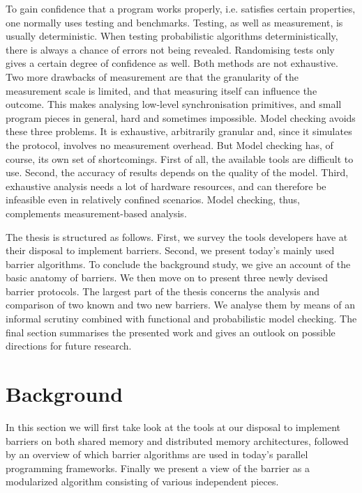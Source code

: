 \documentclass[a4paper, 10pt]{article}
\begin{document}
To gain confidence that a program works properly, i.e. satisfies certain properties, one normally uses testing and benchmarks.
Testing, as well as measurement, is usually deterministic. When testing probabilistic algorithms deterministically, there is always a chance of errors not being revealed. Randomising tests only gives a certain degree of confidence as well. Both methods are not exhaustive.
Two more drawbacks of measurement are that the granularity of the measurement scale is limited, and that measuring itself can influence the outcome. This makes analysing low-level synchronisation primitives, and small program pieces in general, hard and sometimes impossible.
Model checking avoids these three problems. It is exhaustive, arbitrarily granular and, since it simulates the protocol, involves no measurement overhead. But Model checking has, of course, its own set of shortcomings. First of all, the available tools are difficult to use. Second, the accuracy of results depends on the quality of the model. Third, exhaustive analysis needs a lot of hardware resources, and can therefore be infeasible even in relatively confined scenarios.
Model checking, thus, complements measurement-based analysis.

The thesis is structured as follows. First, we survey the tools developers have at their disposal to implement barriers. Second, we present today's mainly used barrier algorithms. To conclude the background study, we give an account of the basic anatomy of barriers.
We then move on to present three newly devised barrier protocols.
The largest part of the thesis concerns the analysis and comparison of two known and two new barriers. We analyse them by means of an informal scrutiny combined with functional and probabilistic model checking.
The final section summarises the presented work and gives an outlook on possible directions for future research.

\section{Background}
\label{sec:background}
In this section we will first take look at the tools at our disposal to implement barriers on both shared memory and distributed memory architectures, followed by an overview of which barrier algorithms are used in today's parallel programming frameworks.
Finally we present a view of the barrier as a modularized algorithm consisting of various independent pieces.
\end{document}
